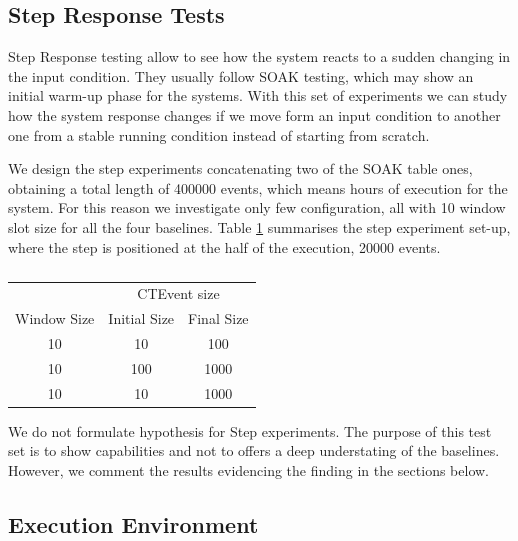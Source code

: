 \subsection{Step Response Tests}\label{sec:step-es}

Step Response testing allow to see how the system reacts to a sudden changing in the input condition. They usually follow SOAK testing, which may show an initial warm-up phase for the systems. With this set of experiments we can study how the system response changes if we move form an input condition to another one from a stable running condition instead of starting from scratch.

We design the step experiments concatenating two of the SOAK table ones, obtaining a total length of 400000 events, which means hours of execution for the system. For this reason we investigate only few configuration, all with 10  window slot size for all the four baselines. Table \ref{tab:steptests} summarises the step experiment set-up, where the step is positioned at the half of the execution, 20000 events.
\begin{table}[htb]
\centering
 \begin{tabular}{c|c|c}
	  	\hline
	  	&\multicolumn{2}{c}{CTEvent size}  \\
		Window Size & Initial Size & Final Size\\
		\hline
		\hline
		 10 & 10 & 100\\
		  10 & 100 & 1000\\
		 10 & 10 & 1000\\
		
		\hline 
 \end{tabular}
	\vspace{10pt}
 \caption{}
\label{tab:steptests}
\end{table}

We do not formulate hypothesis for Step experiments. The purpose of this test set is to show \name capabilities and not to offers a deep understating of the baselines. However, we comment the results evidencing the finding in the sections below.

\subsection{Execution Environment}\label{sec:execution-environment}

